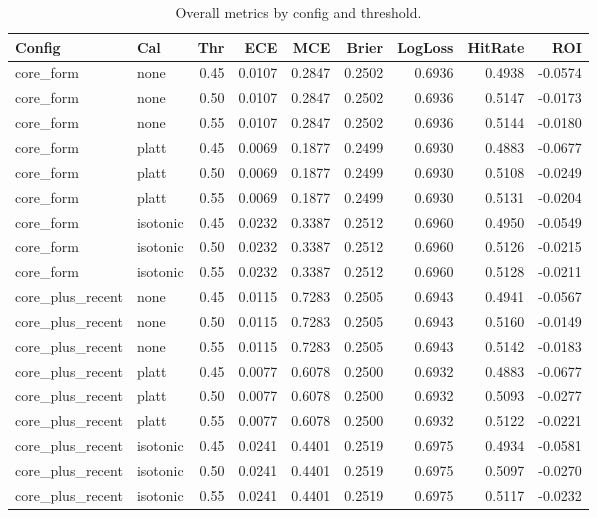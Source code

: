 \begin{table}[t]
  \centering
  \footnotesize
  \caption[GLM overall comparison]{Overall metrics by config and threshold.}
  \label{tab:glm-harness-overall}
  \setlength{\tabcolsep}{3pt}\renewcommand{\arraystretch}{1.1}
  \begin{tabular}{@{} l l r r r r r r r @{} }
    \toprule
    Config & Cal & Thr & ECE & MCE & Brier & LogLoss & HitRate & ROI \\ 
    \midrule
      core\_form & none & 0.45 & 0.0107 & 0.2847 & 0.2502 & 0.6936 & 0.4938 & -0.0574 \\
      core\_form & none & 0.50 & 0.0107 & 0.2847 & 0.2502 & 0.6936 & 0.5147 & -0.0173 \\
      core\_form & none & 0.55 & 0.0107 & 0.2847 & 0.2502 & 0.6936 & 0.5144 & -0.0180 \\
      core\_form & platt & 0.45 & 0.0069 & 0.1877 & 0.2499 & 0.6930 & 0.4883 & -0.0677 \\
      core\_form & platt & 0.50 & 0.0069 & 0.1877 & 0.2499 & 0.6930 & 0.5108 & -0.0249 \\
      core\_form & platt & 0.55 & 0.0069 & 0.1877 & 0.2499 & 0.6930 & 0.5131 & -0.0204 \\
      core\_form & isotonic & 0.45 & 0.0232 & 0.3387 & 0.2512 & 0.6960 & 0.4950 & -0.0549 \\
      core\_form & isotonic & 0.50 & 0.0232 & 0.3387 & 0.2512 & 0.6960 & 0.5126 & -0.0215 \\
      core\_form & isotonic & 0.55 & 0.0232 & 0.3387 & 0.2512 & 0.6960 & 0.5128 & -0.0211 \\
      core\_plus\_recent & none & 0.45 & 0.0115 & 0.7283 & 0.2505 & 0.6943 & 0.4941 & -0.0567 \\
      core\_plus\_recent & none & 0.50 & 0.0115 & 0.7283 & 0.2505 & 0.6943 & 0.5160 & -0.0149 \\
      core\_plus\_recent & none & 0.55 & 0.0115 & 0.7283 & 0.2505 & 0.6943 & 0.5142 & -0.0183 \\
      core\_plus\_recent & platt & 0.45 & 0.0077 & 0.6078 & 0.2500 & 0.6932 & 0.4883 & -0.0677 \\
      core\_plus\_recent & platt & 0.50 & 0.0077 & 0.6078 & 0.2500 & 0.6932 & 0.5093 & -0.0277 \\
      core\_plus\_recent & platt & 0.55 & 0.0077 & 0.6078 & 0.2500 & 0.6932 & 0.5122 & -0.0221 \\
      core\_plus\_recent & isotonic & 0.45 & 0.0241 & 0.4401 & 0.2519 & 0.6975 & 0.4934 & -0.0581 \\
      core\_plus\_recent & isotonic & 0.50 & 0.0241 & 0.4401 & 0.2519 & 0.6975 & 0.5097 & -0.0270 \\
      core\_plus\_recent & isotonic & 0.55 & 0.0241 & 0.4401 & 0.2519 & 0.6975 & 0.5117 & -0.0232 \\
    \bottomrule
  \end{tabular}
\end{table}
